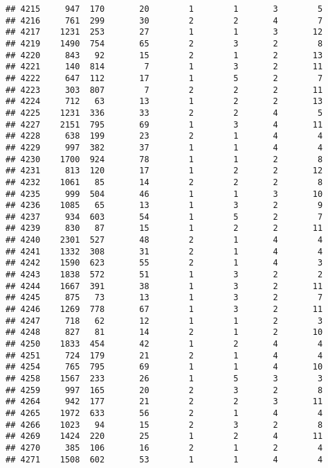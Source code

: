 \documentclass[]{article}
\begin{document}
\begin{verbatim}
## 4215     947  170       20        1        1       3        5
## 4216     761  299       30        2        2       4        7
## 4217    1231  253       27        1        1       3       12
## 4219    1490  754       65        2        3       2        8
## 4220     843   92       15        2        1       2       13
## 4221     140  814        7        1        3       2       11
## 4222     647  112       17        1        5       2        7
## 4223     303  807        7        2        2       2       11
## 4224     712   63       13        1        2       2       13
## 4225    1231  336       33        2        2       4        5
## 4227    2151  795       69        1        3       4       11
## 4228     638  199       23        2        1       4        4
## 4229     997  382       37        1        1       4        4
## 4230    1700  924       78        1        1       2        8
## 4231     813  120       17        1        2       2       12
## 4232    1061   85       14        2        2       2        8
## 4235     999  504       46        1        1       3       10
## 4236    1085   65       13        1        3       2        9
## 4237     934  603       54        1        5       2        7
## 4239     830   87       15        1        2       2       11
## 4240    2301  527       48        2        1       4        4
## 4241    1332  308       31        2        1       4        4
## 4242    1590  623       55        2        1       4        3
## 4243    1838  572       51        1        3       2        2
## 4244    1667  391       38        1        3       2       11
## 4245     875   73       13        1        3       2        7
## 4246    1269  778       67        1        3       2       11
## 4247     718   62       12        1        1       2        3
## 4248     827   81       14        2        1       2       10
## 4250    1833  454       42        1        2       4        4
## 4251     724  179       21        2        1       4        4
## 4254     765  795       69        1        1       4       10
## 4258    1567  233       26        1        5       3        3
## 4259     997  165       20        2        3       2        8
## 4264     942  177       21        2        2       3       11
## 4265    1972  633       56        2        1       4        4
## 4266    1023   94       15        2        3       2        8
## 4269    1424  220       25        1        2       4       11
## 4270     385  106       16        2        1       2        4
## 4271    1508  602       53        1        1       4        4

\end{verbatim}
\end{document}

